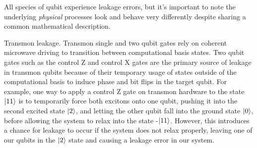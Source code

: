 \documentclass[11pt, notitlepage, letterpaper]{article}
\begin{document}
All species of qubit experience leakage errors, but it's important to note the underlying \emph{physical} processes look and behave very differently despite sharing a common mathematical description.


Transmon leakage. Transmon single and two qubit gates rely on coherent microwave driving to transition between computational basis states. Two qubit gates such as the control Z and control X gates are the primary source of leakage in transmon qubits because of their temporary usage of states outside of the computational basis to induce phase and bit flips in the target qubit. For example, one way to apply a control Z gate on transmon hardware to the state {$\ket{11}$} is to temporarily force both excitons onto one qubit, pushing it into the second excited state {$\ket{2}$}, and letting the other qubit fall into the ground state {$\ket{0}$}, before allowing the system to relax into the state  -{$\ket{11}$}. However, this introduces a chance for leakage to occur if the system does not relax properly, leaving one of our qubits in the {$\ket{2}$} state and causing a leakage error in our system.
\end{document}

